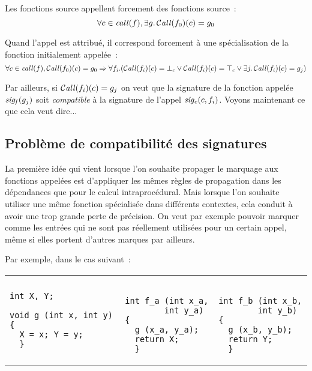 Les fonctions source appellent forcement des fonctions source~:
\begin{equation*}
\forall c \in \mathit{call}(f), \exists g. \operatorname{\mathcal{C\mathit{all}}}(f_0)(c) = g_0
\end{equation*}

Quand l'appel est attribué, il correspond forcement à une spécialisation
de la fonction initialement appelée~:
\begin{equation*}
\forall c \in \mathit{call}(f), \operatorname{\mathcal{C\mathit{all}}}(f_0)(c) = g_0 
\Rightarrow \forall f_i. (\operatorname{\mathcal{C\mathit{all}}}(f_i)(c)  = {\bot}_c \lor \operatorname{\mathcal{C\mathit{all}}}(f_i)(c)  = {\top}_c 
\lor \exists j. \operatorname{\mathcal{C\mathit{all}}}(f_i)(c)  = g_j)
\end{equation*}

Par ailleurs, si $\operatorname{\mathcal{C\mathit{all}}}(f_i)(c)  = g_j$
on veut que la signature de la fonction appelée 
$\mathit{sig_f}(g_j)$ soit {\it compatible}
à la signature de l'appel $\mathit{sig_c}(c, f_i)$.
Voyons maintenant ce que cela veut dire...

\subsection{Problème de compatibilité des signatures}\label{sec-compat-sig}

La première idée qui vient lorsque l'on souhaite propager le marquage
aux fonctions appelées est d'appliquer les mêmes règles de propagation dans les
dépendances que pour le calcul
intraprocédural. Mais lorsque l'on souhaite utiliser une même fonction
spécialisée dans différents contextes, cela conduit à avoir une trop grande
perte de précision. On veut par exemple pouvoir marquer
comme \spare{} les entrées qui ne sont pas réellement utilisées pour un certain
appel, même si elles portent d'autres marques par ailleurs.
\bb

Par exemple, dans le cas suivant~:

\noindent\begin{tabular}{p{5cm}p{4cm}p{4cm}}
\begin{verbatim}
int X, Y;

void g (int x, int y) {
  X = x; Y = y;
  }
\end{verbatim}
&
\begin{verbatim}

int f_a (int x_a, 
        int y_a) {
  g (x_a, y_a);
  return X;
  }
\end{verbatim}
&
\begin{verbatim}

int f_b (int x_b, 
        int y_b) {
  g (x_b, y_b);
  return Y;
  }
\end{verbatim}
\end{tabular}


